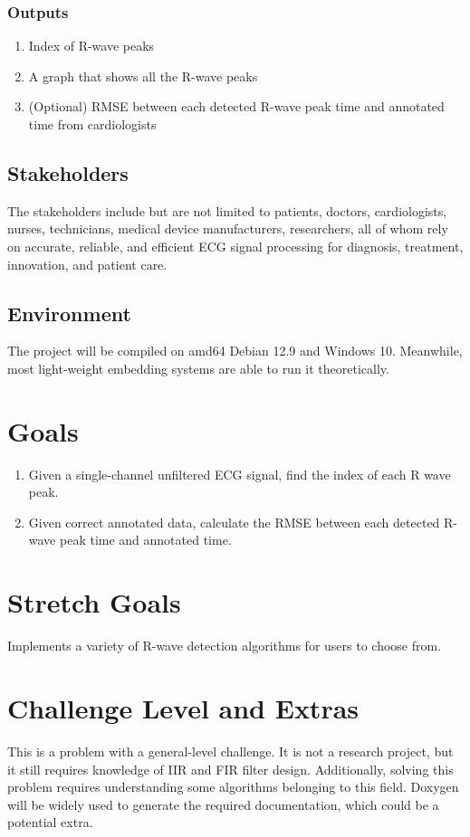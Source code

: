 \documentclass{article}
\begin{document}
\subsubsection{Outputs}

\begin{enumerate}
    \item Index of R-wave peaks
    \item A graph that shows all the R-wave peaks
    \item (Optional) RMSE between each detected R-wave peak time and annotated time from cardiologists
\end{enumerate}

\subsection{Stakeholders}

The stakeholders include but are not limited to patients, doctors, cardiologists, nurses, technicians, medical device manufacturers, researchers, all of whom rely on accurate, reliable, and efficient ECG signal processing for diagnosis, treatment, innovation, and patient care.

\subsection{Environment}

The project will be compiled on amd64 Debian 12.9 and Windows 10. Meanwhile, most light-weight embedding systems are able to run it theoretically.

\section{Goals}

\begin{enumerate}
    \item Given a single-channel unfiltered ECG signal, find the index of each R wave peak.
    \item Given correct annotated data, calculate the RMSE between each detected R-wave peak time and annotated time.
\end{enumerate}

\section{Stretch Goals}

Implements a variety of R-wave detection algorithms for users to choose from.

\section{Challenge Level and Extras}

This is a problem with a general-level challenge. It is not a research project, but it still requires knowledge of IIR and FIR filter design. Additionally, solving this problem requires understanding some algorithms belonging to this field. Doxygen will be widely used to generate the required documentation, which could be a potential extra.
\end{document}
